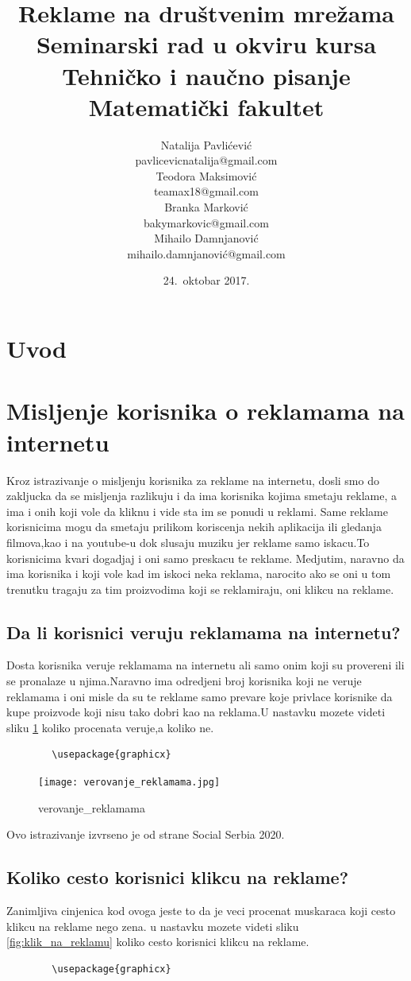 \documentclass[a4paper]{article}
\title{Reklame na društvenim mrežama\\ \small{Seminarski rad u okviru kursa\\Tehničko i naučno pisanje\\ Matematički fakultet}}
\author{Natalija Pavlićević\\ pavlicevicnatalija@gmail.com\\ Teodora Maksimović\\ teamax18@gmail.com\\ Branka Marković\\ bakymarkovic@gmail.com\\ Mihailo Damnjanović\\ mihailo.damnjanović@gmail.com}
\date{24.~oktobar 2017.}
\begin{document}
	
\section{Uvod}
\label{sec:uvod}
	\section{Misljenje korisnika o reklamama na internetu}
	\label{sec:misljenje}
	Kroz istrazivanje o misljenju korisnika za reklame na internetu, dosli smo do zakljucka da se misljenja razlikuju i da ima korisnika kojima smetaju reklame, a ima i onih koji vole da kliknu i vide sta im se ponudi u reklami.
	Same reklame korisnicima mogu da smetaju prilikom koriscenja nekih aplikacija ili gledanja filmova,kao i na youtube-u dok slusaju muziku jer reklame samo iskacu.To korisnicima kvari dogadjaj i oni samo preskacu te reklame.
	Medjutim, naravno da ima korisnika i koji vole kad im iskoci neka reklama, narocito ako se oni u tom trenutku tragaju za tim proizvodima koji se reklamiraju, oni klikcu na reklame.
	\subsection{Da li korisnici veruju reklamama na internetu?}
	\label{subsec:veovanje_reklamama}
	Dosta korisnika veruje reklamama na internetu ali samo onim koji su provereni ili se pronalaze u njima.Naravno ima odredjeni broj korisnika koji ne veruje reklamama i oni misle da su te reklame samo prevare koje privlace korisnike da kupe proizvode koji nisu tako dobri kao na reklama.U nastavku mozete videti sliku \ref{fig:verovanje_reklamama} koliko procenata veruje,a koliko ne.
	\begin{verbatim}
		\usepackage{graphicx}
	\end{verbatim}
	
	\begin{figure}[h!]
		\begin{center}
			\texttt{[image: verovanje\_reklamama.jpg]}
		\end{center}
		\caption{verovanje_reklamama}
		\label{fig:verovanje_reklamama}
	\end{figure}
	Ovo istrazivanje izvrseno je od strane Social Serbia 2020.
	\subsection{Koliko cesto korisnici klikcu na reklame?}
	\label{subsec:klik_na_reklamu}
	Zanimljiva cinjenica kod ovoga jeste to da je veci procenat muskaraca koji cesto klikcu na reklame nego zena. u nastavku mozete videti sliku \ref{fig:klik_na_reklamu} koliko cesto korisnici klikcu na reklame.
		\begin{verbatim}
		\usepackage{graphicx}
	\end{verbatim}
	
\end{document}
